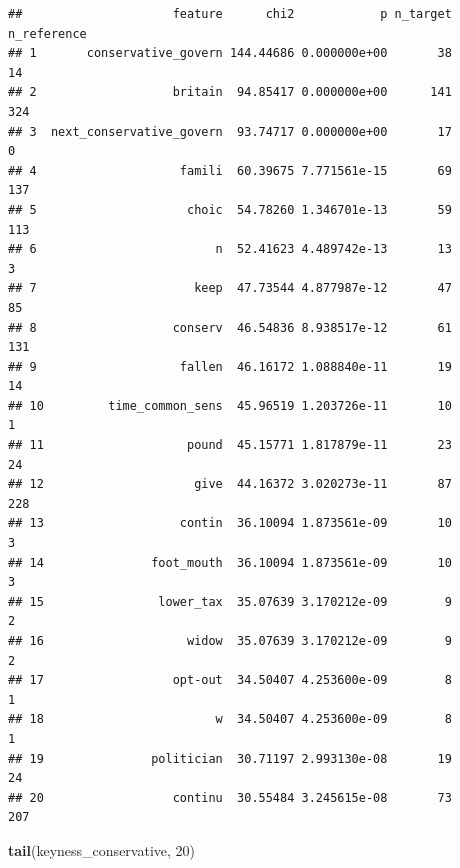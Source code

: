 \documentclass[
]{book}
\newenvironment{Shaded}{\begin{snugshade}}{\end{snugshade}}
\newcommand{\DecValTok}[1]{\textcolor[rgb]{0.00,0.00,0.81}{#1}}
\newcommand{\FunctionTok}[1]{\textcolor[rgb]{0.13,0.29,0.53}{\textbf{#1}}}
\newcommand{\NormalTok}[1]{#1}
\begin{document}
\begin{verbatim}
##                     feature      chi2            p n_target n_reference
## 1       conservative_govern 144.44686 0.000000e+00       38          14
## 2                   britain  94.85417 0.000000e+00      141         324
## 3  next_conservative_govern  93.74717 0.000000e+00       17           0
## 4                    famili  60.39675 7.771561e-15       69         137
## 5                     choic  54.78260 1.346701e-13       59         113
## 6                         n  52.41623 4.489742e-13       13           3
## 7                      keep  47.73544 4.877987e-12       47          85
## 8                   conserv  46.54836 8.938517e-12       61         131
## 9                    fallen  46.16172 1.088840e-11       19          14
## 10         time_common_sens  45.96519 1.203726e-11       10           1
## 11                    pound  45.15771 1.817879e-11       23          24
## 12                     give  44.16372 3.020273e-11       87         228
## 13                   contin  36.10094 1.873561e-09       10           3
## 14               foot_mouth  36.10094 1.873561e-09       10           3
## 15                lower_tax  35.07639 3.170212e-09        9           2
## 16                    widow  35.07639 3.170212e-09        9           2
## 17                  opt-out  34.50407 4.253600e-09        8           1
## 18                        w  34.50407 4.253600e-09        8           1
## 19               politician  30.71197 2.993130e-08       19          24
## 20                  continu  30.55484 3.245615e-08       73         207
\end{verbatim}

\begin{Shaded}
\begin{Highlighting}[]
\FunctionTok{tail}\NormalTok{(keyness\_conservative, }\DecValTok{20}\NormalTok{)}
\end{Highlighting}
\end{Shaded}
\end{document}
